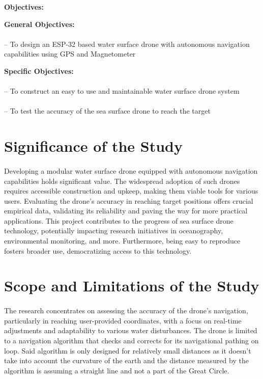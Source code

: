 \vspace{1cm}

\begin{center}
\bf Objectives:
\end{center}

{\bf General Objectives:}
\paragraph{} -- To design an ESP-32 based water surface drone with autonomous navigation capabilities using GPS and Magnetometer

{\bf Specific Objectives:}
\paragraph{} -- To construct an easy to use and maintainable water surface drone system
\paragraph{} -- To test the accuracy of the sea surface drone to reach the target 

\section{Significance of the Study}
\paragraph{} Developing a modular water surface drone equipped with autonomous navigation capabilities holds significant value. The widespread adoption of
            such drones requires accessible construction and upkeep, making them viable tools for various users. Evaluating the drone's accuracy in reaching
            target positions offers crucial empirical data, validating its reliability and paving the way for more practical applications. This project 
            contributes to the progress of sea surface drone technology, potentially impacting research initiatives in oceanography, environmental monitoring, 
            and more. Furthermore, being easy to reproduce fosters broader use, democratizing access to this technology.

\section{Scope and Limitations of the Study}
\paragraph{} The research concentrates on assessing the accuracy of the drone's navigation, particularly in reaching user-provided coordinates, with a focus
            on real-time adjustments and adaptability to various water disturbances.  The drone is limited to a navigation algorithm that checks and corrects
            for its navigational pathing on loop. Said algorithm is only designed for relatively small distances as it doesn't take into account the curvature 
            of the earth and the distance measured by the algorithm is assuming a straight line and not a part of the Great Circle.

